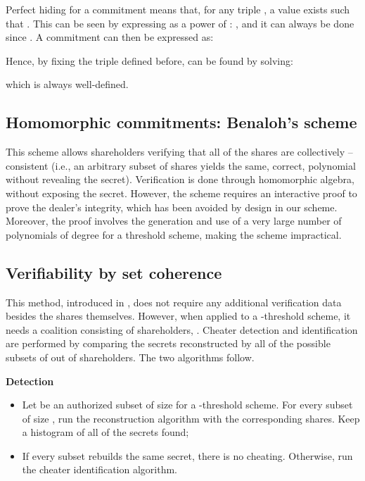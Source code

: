 \documentclass[10pt,journal,cspaper,compsoc]{IEEEtran}
\begin{document}
Perfect hiding for a commitment  means that, for any triple , a value  exists such that . This can be seen by expressing  as a power of : , and it can always be done since . A commitment can then be expressed as:



Hence, by fixing the triple defined before,  can be found by solving:



which is always well-defined.

\subsection{Homomorphic commitments: Benaloh's scheme}
\label{benalohvss}
This scheme \cite{conf/crypto/Benaloh86a} allows shareholders verifying that all of the shares are collectively --consistent (i.e., an arbitrary subset  of  shares yields the same, correct, polynomial without revealing the secret). Verification is done through homomorphic algebra, without exposing the secret. However, the scheme requires an interactive proof to prove the dealer's integrity, which has been avoided by design in our scheme. Moreover, the proof involves the generation and use of a very large number of polynomials of degree  for a  threshold scheme, making the scheme impractical.

\subsection{Verifiability by set coherence}
\label{setcoherence}
This method, introduced in \cite{journals/dcc/HarnL09}, does not require any additional verification data besides the shares themselves.
However, when applied to a -threshold scheme, it needs a coalition consisting
of  shareholders, . Cheater detection and identification are performed by comparing the secrets reconstructed by all of the
possible subsets of  out of  shareholders. The two algorithms follow.


\textbf{Detection}

\begin{itemize}
\item{Let  be an authorized subset of size  for a -threshold scheme. For every subset
 of size , run the reconstruction algorithm with the corresponding shares. Keep a
histogram of all of the secrets found};
\item{If every subset  rebuilds the same secret, there is no cheating. Otherwise, run the cheater identification algorithm.}
\end{itemize}
\end{document}
